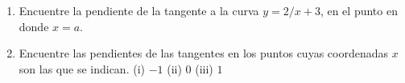 \item 
    \begin{enumerate}
        \item Encuentre la pendiente de la tangente a la curva $y = 2/x + 3$, en el punto en donde $x = a$.
        \item Encuentre las pendientes de las tangentes en los puntos cuyas coordenadas $x$ son las que se indican.
        (i) $-1$ \quad (ii) $0$ \quad (iii) $1$
    \end{enumerate}
